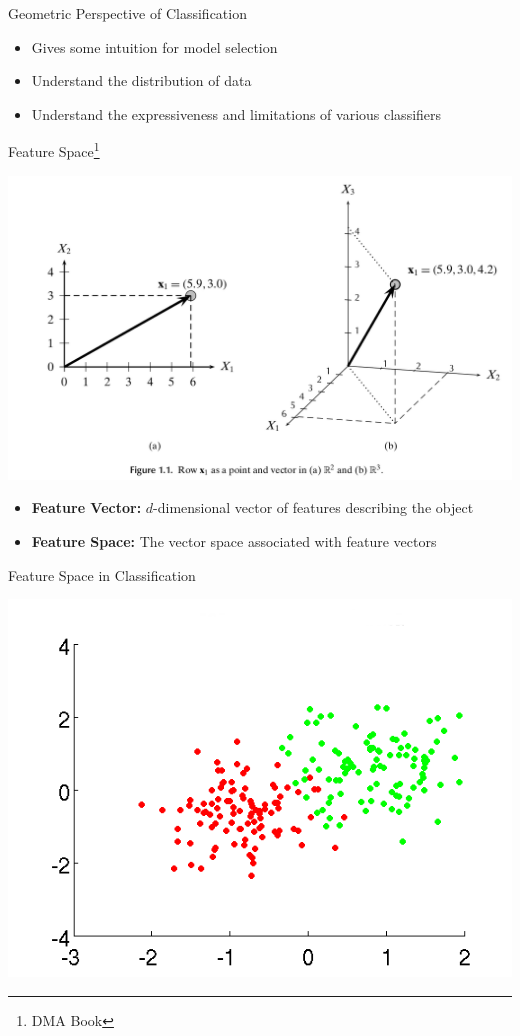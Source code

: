 \documentclass{beamer}
\begin{document}
\begin{frame}{Geometric Perspective of Classification}
    \begin{itemize}
        \item Gives some intuition for model selection
        \item Understand the distribution of data
        \item Understand the expressiveness and limitations of various classifiers
    \end{itemize}
\end{frame}

\begin{frame}{Feature Space\footnote{DMA Book}}
    \begin{center}
        \includegraphics[scale=0.15]{geometricView.png}
    \end{center}
    \begin{itemize}
        \item {\bf Feature Vector:} $d$-dimensional vector of features describing the object
        \item {\bf Feature Space:} The vector space associated with feature vectors
    \end{itemize}
\end{frame}

\begin{frame}{Feature Space in Classification}
    \begin{center}
        \includegraphics[scale=0.5]{featureSpace.png}
    \end{center}
\end{frame}
\end{document}

